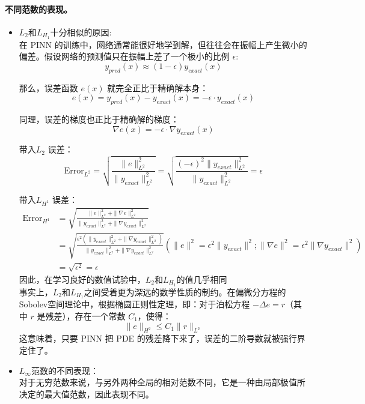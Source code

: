 \documentclass[UTF8, 12pt]{ctexart}
\begin{document}
\paragraph{不同范数的表现。}
\begin{itemize}

    \item{$L_2$和$L_{H_1}$十分相似的原因:}\\
    在 PINN 的训练中，网络通常能很好地学到解，但往往会在振幅上产生微小的偏差。假设网络的预测值只在振幅上差了一个极小的比例 $\epsilon$:
    \begin{equation}
        y_{pred}(x) \approx (1 - \epsilon) y_{exact}(x) 
    \end{equation}

那么，误差函数 $e(x)$ 就完全正比于精确解本身：
\begin{equation}
    e(x) = y_{pred}(x) - y_{exact}(x) = -\epsilon \cdot y_{exact}(x)
\end{equation} 

同理，误差的梯度也正比于精确解的梯度：
\begin{equation}
    \nabla e(x) = -\epsilon \cdot \nabla y_{exact}(x)
\end{equation}

带入$L_2$ 误差：
\begin{equation}
    \text{Error}_{L^2} = \sqrt{\frac{\|e\|_{L^2}^2}{\|y_{exact}\|_{L^2}^2}} = \sqrt{\frac{(-\epsilon)^2 \|y_{exact}\|_{L^2}^2}{\|y_{exact}\|_{L^2}^2}} = \epsilon
\end{equation} 

带入$L_{H^1}$ 误差：
\begin{align}
    \text{Error}_{H^1} &= \sqrt{\frac{\|e\|_{L^2}^2 + \|\nabla e\|_{L^2}^2}{\|y_{exact}\|_{L^2}^2 + \|\nabla y_{exact}\|_{L^2}^2}}\\
    &= \sqrt{\frac{\epsilon^2 \left( \|y_{exact}\|_{L^2}^2 + \|\nabla y_{exact}\|_{L^2}^2 \right)}{\|y_{exact}\|_{L^2}^2 + \|\nabla y_{exact}\|_{L^2}^2}}  (\|e\|^2 = \epsilon^2 \|y_{exact}\|^2;\|\nabla e\|^2 = \epsilon^2 \|\nabla y_{exact}\|^2)\\
    &= \sqrt{\epsilon^2} = \epsilon
\end{align}
因此，在学习良好的数值试验中，$L_2$和$L_{H_1}$的值几乎相同\\

事实上，$L_2$和$L_{H_1}$之间受着更为深远的数学性质的制约。在偏微分方程的Sobolev空间理论中，根据椭圆正则性定理，即：对于泊松方程 $-\Delta e = r$（其中 $r$ 是残差），存在一个常数 $C_1$，使得：$$ \|e\|_{H^2} \le C_1 \|r\|_{L^2} $$这意味着，只要 PINN 把 PDE 的残差降下来了，误差的二阶导数就被强行界定住了。

\item{$L_\infty$范数的不同表现：}\\
对于无穷范数来说，与另外两种全局的相对范数不同，它是一种由局部极值所决定的最大值范数，因此表现不同。


\end{itemize}
\end{document}
